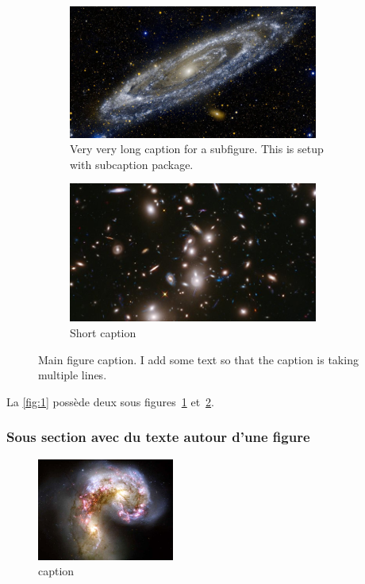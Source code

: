 \blindtext[4]
\begin{figure}[htbp]
    \centering
    \begin{subfigure}[t]{0.49\textwidth}
        \centering
        \includegraphics[width=0.9\textwidth]{./image2.jpg}
        \caption{Very very long caption for a subfigure. This is setup with subcaption package.}%
        \label{fig:1a}
    \end{subfigure}
    \hfill
    \begin{subfigure}[t]{0.49\textwidth}
        \centering
        \includegraphics[width=0.9\textwidth]{./image3.jpg}
        \caption{Short caption}%
        \label{fig:1b}
    \end{subfigure}
    \caption{Main figure caption. I add some text so that the caption is taking multiple lines.}%
    \label{fig:1}
\end{figure}

La \autoref{fig:1} possède deux sous figures~\ref{fig:1a} et~\ref{fig:1b}.

\subsubsection{Sous section avec du texte autour d'une figure}

\blindtext[1]
\begin{figure} %
    \centering
    \includegraphics[width=0.4\textwidth]{./image4.jpg}%
    \caption{caption}%
    \label{fig:wrapfig}
\end{figure}
\blindtext[2]

